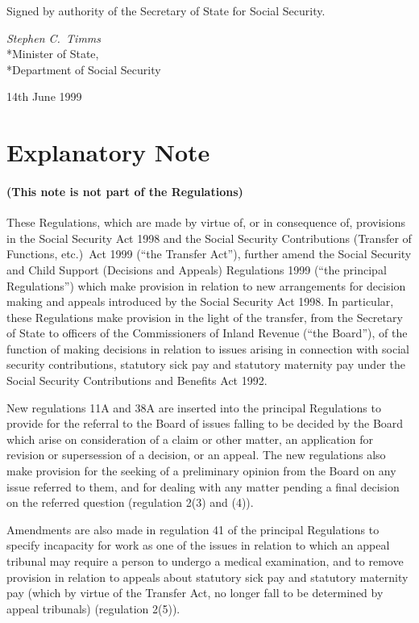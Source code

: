 \documentclass[12pt,a4paper]{article}
\begin{document}
\bigskip

Signed 
by authority of the Secretary of State for Social Security.

{\raggedleft
\emph{Stephen C.\ Timms
}\\*Minister of State,\\*Department of Social Security

}

14th June 1999

\small

\part{Explanatory Note}

\renewcommand\parthead{--- Explanatory Note}

\subsection*{(This note is not part of the Regulations)}

These Regulations, which are made by virtue of, or in consequence of, provisions in the Social Security Act 1998 and the Social Security Contributions (Transfer of Functions, etc.)\ Act 1999 (“the Transfer Act”), further amend the Social Security and Child Support (Decisions and Appeals) Regulations 1999 (“the principal Regulations”) which make provision in relation to new arrangements for decision making and appeals introduced by the Social Security Act 1998. In particular, these Regulations make provision in the light of the transfer, from the Secretary of State to officers of the Commissioners of Inland Revenue (“the Board”), of the function of making decisions in relation to issues arising in connection with social security contributions, statutory sick pay and statutory maternity pay under the Social Security Contributions and Benefits Act 1992.

New regulations 11A and 38A are inserted into the principal Regulations to provide for the referral to the Board of issues falling to be decided by the Board which arise on consideration of a claim or other matter, an application for revision or supersession of a decision, or an appeal. The new regulations also make provision for the seeking of a preliminary opinion from the Board on any issue referred to them, and for dealing with any matter pending a final decision on the referred question (regulation 2(3) and (4)).

Amendments are also made in regulation 41 of the principal Regulations to specify incapacity for work as one of the issues in relation to which an appeal tribunal may require a person to undergo a medical examination, and to remove provision in relation to appeals about statutory sick pay and statutory maternity pay (which by virtue of the Transfer Act, no longer fall to be determined by appeal tribunals) (regulation 2(5)).  
\end{document}
